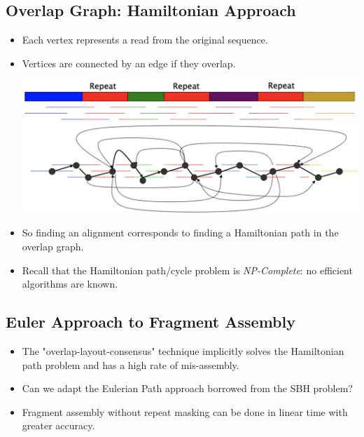 \documentclass[10pt]{article}
\begin{document}
\subsection*{Overlap Graph: Hamiltonian Approach}
\begin{itemize}
    \item Each vertex represents a read from the original sequence.
    \item Vertices are connected by an edge if they overlap.
    \begin{center}
        \includegraphics*[width=\textwidth]{W4_15.png}
    \end{center}
    \item So finding an alignment corresponds to finding a Hamiltonian path in the overlap graph.
    \item Recall that the Hamiltonian path/cycle problem is \textit{NP-Complete}: no efficient algorithms are known.
\end{itemize}

\subsection*{Euler Approach to Fragment Assembly}
\begin{itemize}
    \item The "overlap-layout-consensus" technique implicitly solves the Hamiltonian path problem and has a high rate of mis-assembly.
    \item Can we adapt the Eulerian Path approach borrowed from the SBH problem?
    \item Fragment assembly without repeat masking can be done in linear time with greater accuracy.
\end{itemize}
\end{document}
